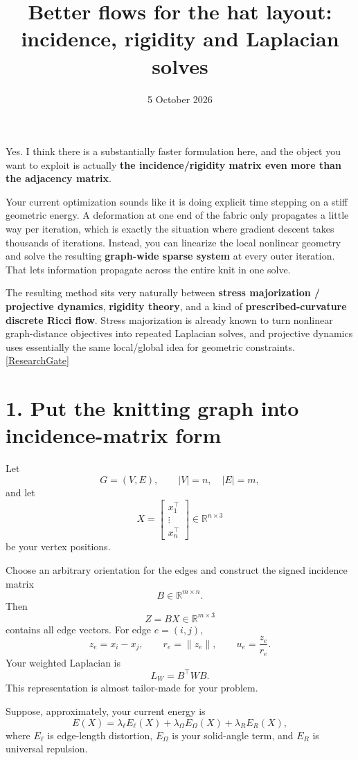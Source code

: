 \documentclass[11pt]{article}
\title{Better flows for the hat layout:\\incidence, rigidity and
Laplacian solves}
\author{}
\date{5 October 2026}
\begin{document}
\maketitle

Yes. I think there is a substantially faster formulation here, and the
object you want to exploit is actually \textbf{the incidence/rigidity
matrix even more than the adjacency matrix}.

Your current optimization sounds like it is doing explicit time stepping on
a stiff geometric energy. A deformation at one end of the fabric only
propagates a little way per iteration, which is exactly the situation where
gradient descent takes thousands of iterations. Instead, you can linearize
the local nonlinear geometry and solve the resulting \textbf{graph-wide
sparse system} at every outer iteration. That lets information propagate
across the entire knit in one solve.

The resulting method sits very naturally between \textbf{stress
majorization / projective dynamics}, \textbf{rigidity theory}, and a kind
of \textbf{prescribed-curvature discrete Ricci flow}. Stress majorization
is already known to turn nonlinear graph-distance objectives into repeated
Laplacian solves, and projective dynamics uses essentially the same
local/global idea for geometric constraints.
\href{https://www.researchgate.net/publication/30508817_Graph_Drawing_by_Stress_Majorization?utm_source=chatgpt.com}{[ResearchGate]}

\section*{1. Put the knitting graph into incidence-matrix form}

Let
\[
G=(V,E),\qquad |V|=n,\quad |E|=m,
\]
and let
\[
X=
\begin{bmatrix}
x_1^\top\\
\vdots\\
x_n^\top
\end{bmatrix}\in\mathbb R^{n\times 3}
\]
be your vertex positions.

Choose an arbitrary orientation for the edges and construct the signed
incidence matrix
\[
B\in\mathbb R^{m\times n}.
\]
Then
\[
Z=BX\in\mathbb R^{m\times3}
\]
contains all edge vectors. For edge \(e=(i,j)\),
\[
z_e=x_i-x_j,\qquad
r_e=\|z_e\|,\qquad
u_e=\frac{z_e}{r_e}.
\]
Your weighted Laplacian is
\[
L_W=B^\top W B.
\]
This representation is almost tailor-made for your problem.

Suppose, approximately, your current energy is
\[
E(X)=
\lambda_\ell E_\ell(X)
+\lambda_\Omega E_\Omega(X)
+\lambda_R E_R(X),
\]
where \(E_\ell\) is edge-length distortion, \(E_\Omega\) is your
solid-angle term, and \(E_R\) is universal repulsion.
\end{document}
